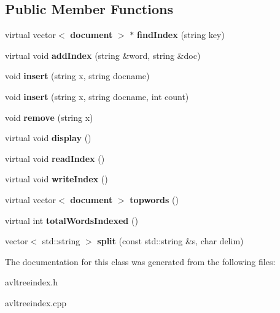 \subsection*{Public Member Functions}
\begin{DoxyCompactItemize}
\item 
virtual vector$<$ {\bf document} $>$ $\ast$ {\bfseries find\+Index} (string key)\label{class_a_v_l_tree_index_af12abae8988a8e7e87407b797da929cd}

\item 
virtual void {\bfseries add\+Index} (string \&word, string \&doc)\label{class_a_v_l_tree_index_a91eee3f7bcb461a7fd1ea32ae7adf4c6}

\item 
void {\bfseries insert} (string x, string docname)\label{class_a_v_l_tree_index_a4ea3e5ab837e990ba337256fbdc1197b}

\item 
void {\bfseries insert} (string x, string docname, int count)\label{class_a_v_l_tree_index_a246f8cef2d713f8384002746e3dd0987}

\item 
void {\bfseries remove} (string x)\label{class_a_v_l_tree_index_a94d5a89508922a253babe44cb92470b1}

\item 
virtual void {\bfseries display} ()\label{class_a_v_l_tree_index_aa8d2a6a216c9662f9ab3f37f0b6445d6}

\item 
virtual void {\bfseries read\+Index} ()\label{class_a_v_l_tree_index_a7630dece23ef3f00269f1b9c868427c9}

\item 
virtual void {\bfseries write\+Index} ()\label{class_a_v_l_tree_index_a15f830a04d1ad46c93c9bca37738383b}

\item 
virtual vector$<$ {\bf document} $>$ {\bfseries topwords} ()\label{class_a_v_l_tree_index_a8bcab7ab0f53524ef7f6891e5b0e115a}

\item 
virtual int {\bfseries total\+Words\+Indexed} ()\label{class_a_v_l_tree_index_ad65184394671fb3373c7730225eaa9b7}

\item 
vector$<$ std\+::string $>$ {\bfseries split} (const std\+::string \&s, char delim)\label{class_a_v_l_tree_index_a54409477f9421266ee4580ee32b07897}

\end{DoxyCompactItemize}


The documentation for this class was generated from the following files\+:\begin{DoxyCompactItemize}
\item 
avltreeindex.\+h\item 
avltreeindex.\+cpp\end{DoxyCompactItemize}
